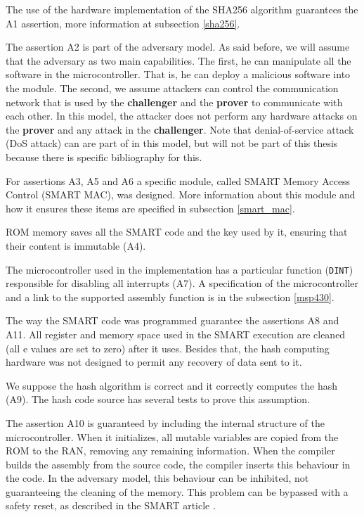 The use of the hardware implementation of the SHA256 algorithm guarantees the A1 assertion,  more information at subsection \ref{sha256}.

The assertion A2 is part of the adversary model. As said before, we will assume that the adversary as two main capabilities. The first, he can manipulate all the software in the microcontroller. That is, he can deploy a malicious software into the module. The second, we assume attackers can control the communication network that is used by the \textbf{challenger} and the \textbf{prover} to communicate with each other. In this model, the attacker does not perform any hardware attacks on the \textbf{prover} and any attack in the  \textbf{challenger}. Note that denial-of-service attack (DoS attack) can are part of in this model, but will not be part of this thesis because there is specific bibliography for this.

For assertions  A3, A5 and A6 a specific module, called SMART Memory Access Control (SMART MAC), was designed. More information about this module and how it ensures these items are specified in subsection \ref{smart_mac}.

ROM memory saves all the SMART code and the key used by it, ensuring that their content is immutable (A4).

The microcontroller used in the implementation has a particular function (\verb|DINT|) responsible for disabling all interrupts (A7). A specification of the microcontroller and a link to the supported assembly function is in the subsection \ref{msp430}.

The way the SMART code was programmed guarantee the assertions A8 and A11. All register and memory space used in the SMART execution are cleaned (all e values are set to zero) after it uses. Besides that, the hash computing hardware was not designed to permit any recovery of data sent to it.

We suppose the hash algorithm is correct and it correctly computes the hash (A9). The hash code source has several tests to prove this assumption.

The assertion A10 is guaranteed by including the internal structure of the microcontroller. When it initializes, all mutable variables are copied from the ROM to the RAN, removing any remaining information. When the compiler builds the assembly from the source code, the compiler inserts this behaviour in the code. In the adversary model, this behaviour can be inhibited, not guaranteeing the cleaning of the memory. This problem can be bypassed with a safety reset, as described in the SMART article \cite{smart}. 

